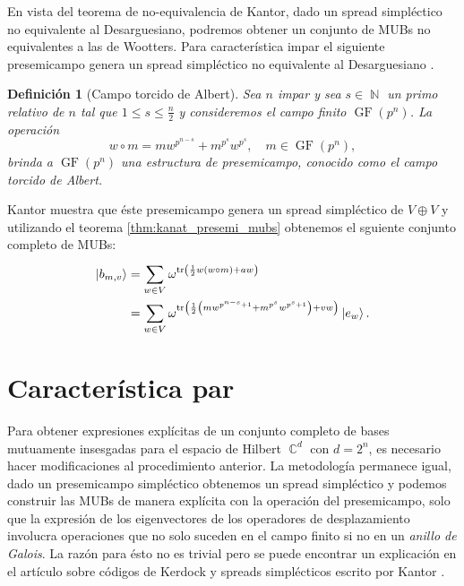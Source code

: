 \documentclass[a4paper]{report}
\DeclareMathOperator{\C}{\mathbb{C}}
\DeclareMathOperator{\N}{\mathbb{N}}
\DeclareMathOperator{\tr}{tr}
\DeclareMathOperator{\GF}{GF}
\newtheorem{definition}{Definición}
\begin{document}
  En vista del teorema de no-equivalencia de Kantor, dado un
  spread simpléctico no equivalente al Desarguesiano,
  podremos obtener un conjunto de MUBs no equivalentes a las
  de Wootters. Para característica impar el siguiente
  presemicampo genera un spread simpléctico no equivalente
  al Desarguesiano \cite{kantor1982}.
  \begin{definition}[Campo torcido de Albert]
    \label{def:alberts_spread}
    Sea $n$ impar y sea $s \in \N$ un primo relativo de $n$
    tal que $1 \leq s \leq \frac{n}{2}$ y consideremos el
    campo finito $\GF(p^{n})$. La operación
    \begin{equation}
      w \circ m
      = mw^{p^{n-s}} + m^{p^{s}} w^{p^{s}},
      \quad m \in \GF(p^{n}),
    \end{equation}
    brinda a $\GF(p^{n})$ una estructura de presemicampo,
    conocido como el campo torcido de Albert.
  \end{definition}
  Kantor muestra que éste presemicampo genera un spread
  simpléctico de $V \oplus V$ y utilizando el teorema
  \ref{thm:kanat_presemi_mubs} obtenemos el sguiente
  conjunto completo de MUBs:
  \begin{align}
    \ket{b_{m,v}}
    &= \sum_{w \in V}^{}
    \omega^{\tr\left(
      \frac{1}{2} w (w \circ m) + a w
    \right) } \\
    &= \sum_{w \in V}^{}
    \omega^{\tr\left(
      \frac{1}{2}
      \left(
        mw^{p^{n-s}+1} + m^{p^{s}}w^{p^{s}+1}
      \right) + v w
    \right) } \ket{e_w}.
  \end{align}
    
  \section{Característica par}

  Para obtener expresiones explícitas de un conjunto
  completo de bases mutuamente insesgadas para el espacio de
  Hilbert $\C^{d}$ con $d = 2^{n}$, es necesario hacer
  modificaciones al procedimiento anterior. La metodología
  permanece igual, dado un presemicampo simpléctico
  obtenemos un spread simpléctico y podemos construir las
  MUBs de manera explícita con la operación del
  presemicampo, solo que la expresión de los eigenvectores
  de los operadores de desplazamiento involucra operaciones
  que no solo suceden en el campo finito si no en un
  \textit{anillo de Galois}. La razón para ésto no es
  trivial pero se puede encontrar un explicación en el
  artículo sobre códigos de Kerdock y spreads simplécticos
  escrito por Kantor \cite{kantor1982}.
\end{document}

